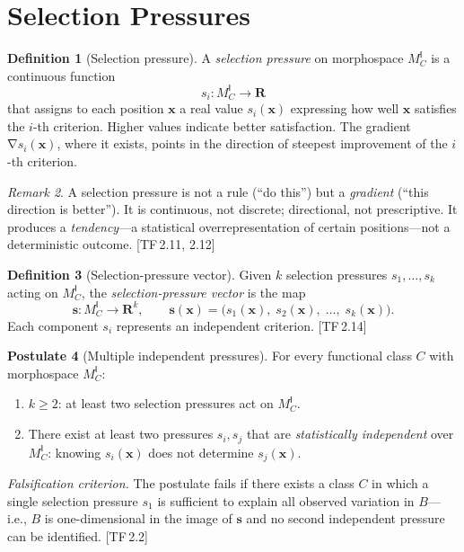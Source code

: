 \documentclass[11pt, a4paper]{article}
\theoremstyle{definition}
\newtheorem{definition}{Definition}[section]
\newtheorem{postulate}[definition]{Postulate}
\theoremstyle{plain}
\theoremstyle{remark}
\newtheorem{remark}[definition]{Remark}
\newcommand{\MC}{M^{\mathsf{I}}_C}          %
\providecommand{\R}{}
\renewcommand{\R}{\mathbf{R}}               %
\DeclareMathOperator{\grad}{\nabla}
\newcommand{\TF}[1]{\textnormal{[TF\,#1]}}  %
\begin{document}
\section{Selection Pressures}\label{sec:pressures}

\begin{definition}[Selection pressure]\label{def:2.1}
A \emph{selection pressure} on morphospace $\MC$ is a continuous
function
\[
  s_i : \MC \longrightarrow \R
\]
that assigns to each position $\bm{x}$ a real value $s_i(\bm{x})$
expressing how well $\bm{x}$ satisfies the $i$-th criterion.
Higher values indicate better satisfaction. The gradient
$\grad s_i(\bm{x})$, where it exists, points in the direction of
steepest improvement of the $i$-th criterion.
\end{definition}

\begin{remark}
A selection pressure is not a rule (``do this'') but a \emph{gradient}
(``this direction is better''). It is continuous, not discrete;
directional, not prescriptive. It produces a \emph{tendency}---a
statistical overrepresentation of certain positions---not a deterministic
outcome. \TF{2.11, 2.12}
\end{remark}

\begin{definition}[Selection-pressure vector]\label{def:2.2}
Given $k$ selection pressures $s_1, \ldots, s_k$ acting on $\MC$,
the \emph{selection-pressure vector} is the map
\[
  \bm{s} : \MC \longrightarrow \R^k, \qquad
  \bm{s}(\bm{x}) = \bigl(s_1(\bm{x}),\; s_2(\bm{x}),\; \ldots,\;
  s_k(\bm{x})\bigr).
\]
Each component $s_i$ represents an independent criterion. \TF{2.14}
\end{definition}

\begin{postulate}[Multiple independent pressures]\label{post:2.3}
For every functional class $C$ with morphospace $\MC$:
\begin{enumerate}[label=(\alph*),nosep]
  \item $k \geq 2$: at least two selection pressures act on $\MC$.
  \item There exist at least two pressures $s_i, s_j$ that are
    \emph{statistically independent} over $\MC$: knowing $s_i(\bm{x})$
    does not determine $s_j(\bm{x})$.
\end{enumerate}

\medskip\noindent
\textit{Falsification criterion.}
The postulate fails if there exists a class $C$ in which a single
selection pressure $s_1$ is sufficient to explain all observed variation
in $B$---i.e., $B$ is one-dimensional in the image of $\bm{s}$ and no
second independent pressure can be identified. \TF{2.2}
\end{postulate}
\end{document}
